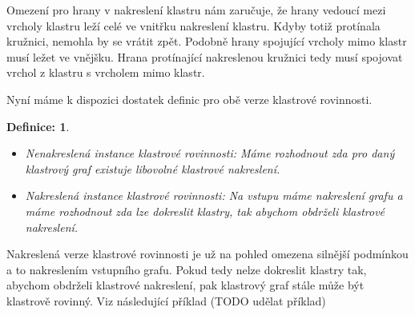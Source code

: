 \documentclass[12pt,a4report]{report}
\newtheorem{def3}{Definice: }
\begin{document}
\par
Omezení pro hrany v nakreslení klastru nám zaručuje, že hrany vedoucí mezi vrcholy klastru leží celé ve vnitřku nakreslení klastru. Kdyby totiž protínala kružnici, nemohla by se vrátit zpět. Podobně hrany spojující vrcholy mimo klastr musí ležet ve vnějšku. Hrana protínající nakreslenou kružnici tedy musí spojovat vrchol z klastru s vrcholem mimo klastr.

\par
Nyní máme k dispozici dostatek definic pro obě verze klastrové rovinnosti.

\begin{def3}
\begin{itemize}
\item Nenakreslená instance klastrové rovinnosti: Máme rozhodnout zda pro daný klastrový graf existuje libovolné klastrové nakreslení.
\item Nakreslená instance klastrové rovinnosti: Na vstupu máme nakreslení grafu a máme rozhodnout zda lze dokreslit klastry, tak abychom obdrželi klastrové nakreslení.
\end{itemize}
\end{def3}

Nakreslená verze klastrové rovinnosti je už na pohled omezena silnější podmínkou a to nakreslením vstupního grafu. Pokud tedy nelze dokreslit klastry tak, abychom obdrželi klastrové nakreslení, pak klastrový graf stále může být klastrově rovinný. Viz následující příklad (TODO udělat příklad)
\end{document}
